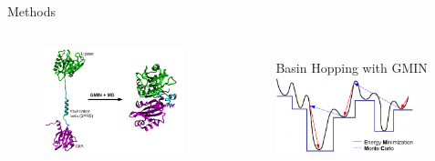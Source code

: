 \documentclass{beamer}
\begin{document}
\begin{frame}[t]
\begin{columns}[T,onlytextwidth]
\begin{column}[T]{.48\linewidth}
{\begin{block}{Methods}
            \begin{columns}[t]
                \begin{figure}
                    \includegraphics[width=.9\linewidth]{figures/complex/complex_folding.pdf}
                \end{figure}        

                \begin{figure}
                    Basin Hopping with GMIN
                    \includegraphics[width=0.9\textwidth]{figures/GMIN/GMIN.pdf}
                \end{figure}         

            \end{columns}    


\end{block}}
\end{column}
\end{columns}
\end{frame}
\end{document}
